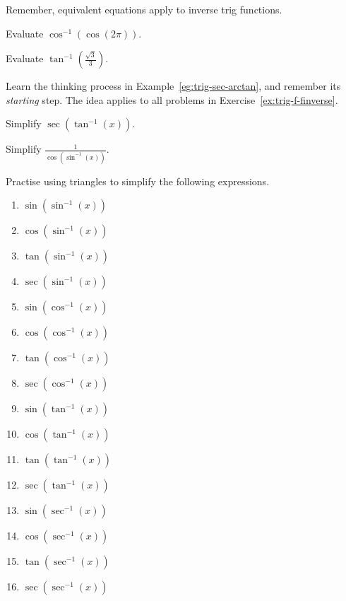 \documentclass[../main.tex]{subfiles}
\begin{document}
Remember, equivalent equations apply to inverse trig functions.
\begin{example} \label{eg:arccos-cos-caution}
  Evaluate \(\cos^{-1}(\cos(2\pi))\). 

\end{example}

\begin{exercise}
  Evaluate \(\tan^{-1}\left(\frac{\sqrt{3}}{3}\right)\).

\end{exercise}
\clearpage

Learn the thinking process in Example~\ref{eg:trig-sec-arctan}, and remember its \emph{starting} step.  The idea applies to all problems in Exercise~\ref{ex:trig-f-finverse}.
\begin{example} \label{eg:trig-sec-arctan}
  Simplify \(\sec(\tan^{-1}(x))\).   

\end{example}

\begin{exercise} \label{eg:trig-cos-arcsin}
  Simplify \(\frac{1}{\cos(\sin^{-1}(x))}\).

\end{exercise}
\clearpage

\begin{exercise} \label{ex:trig-f-finverse}
  Practise using triangles to simplify the following expressions. 

  \begin{multicols}{4}
    \begin{enumerate}
      \item \(\sin(\sin^{-1}(x))\)
      \item \(\cos(\sin^{-1}(x))\)
      \item \(\tan(\sin^{-1}(x))\)
      \item \(\sec(\sin^{-1}(x))\)
      \item \(\sin(\cos^{-1}(x))\)
      \item \(\cos(\cos^{-1}(x))\)
      \item \(\tan(\cos^{-1}(x))\)
      \item \(\sec(\cos^{-1}(x))\)
      \item \(\sin(\tan^{-1}(x))\)
      \item \(\cos(\tan^{-1}(x))\)
      \item \(\tan(\tan^{-1}(x))\)
      \item \(\sec(\tan^{-1}(x))\)
      \item \(\sin(\sec^{-1}(x))\)
      \item \(\cos(\sec^{-1}(x))\)
      \item \(\tan(\sec^{-1}(x))\)
      \item \(\sec(\sec^{-1}(x))\)
    \end{enumerate}
  \end{multicols}

\end{exercise}
\clearpage
\end{document}
